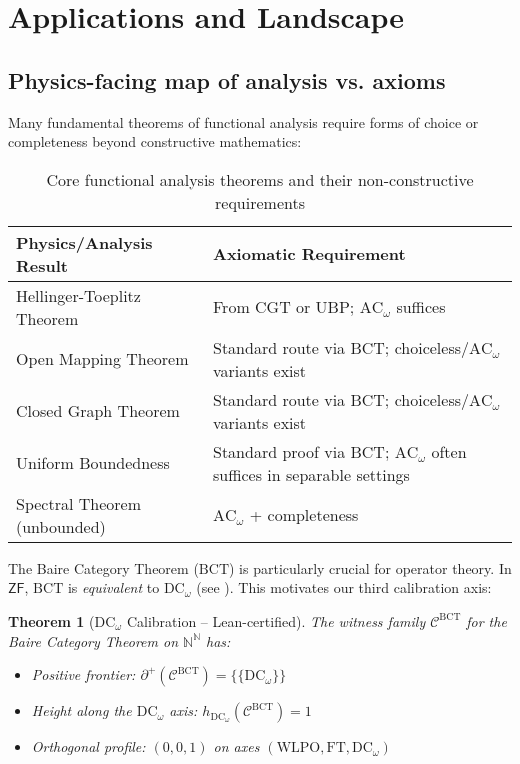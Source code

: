 \documentclass[11pt]{article}
\newtheorem{theorem}{Theorem}[section]
\newcommand{\N}{\mathbb{N}}
\newcommand{\WLPO}{\mathrm{WLPO}}
\newcommand{\FT}{\mathrm{FT}}
\newcommand{\DCw}{\mathrm{DC}_\omega}
\newcommand{\ACw}{\mathrm{AC}_\omega}
\newcommand{\BCT}{\mathrm{BCT}}
\newcommand{\Frontierpos}{\partial^{+}}
\begin{document}
\section{Applications and Landscape}\label{sec:applications}

\subsection{Physics-facing map of analysis vs. axioms}

Many fundamental theorems of functional analysis require forms of choice or completeness beyond constructive mathematics:

\begin{table}[h]
\centering
\begin{tabular}{ll}
\hline
\textbf{Physics/Analysis Result} & \textbf{Axiomatic Requirement} \\
\hline
Hellinger-Toeplitz Theorem & From CGT or UBP; $\ACw{}$ suffices \\
Open Mapping Theorem & Standard route via BCT; choiceless/$\ACw{}$ variants exist \\
Closed Graph Theorem & Standard route via BCT; choiceless/$\ACw{}$ variants exist \\
Uniform Boundedness & Standard proof via BCT; $\ACw{}$ often suffices in separable settings \\
Spectral Theorem (unbounded) & $\ACw{}$ + completeness \\
\hline
\end{tabular}
\caption{Core functional analysis theorems and their non-constructive requirements}
\label{tab:physics-analysis}
\end{table}

The Baire Category Theorem ($\BCT{}$) is particularly crucial for operator theory. In $\mathsf{ZF}$, $\BCT{}$ is \emph{equivalent} to $\DCw{}$ (see \cite{Blair77}). This motivates our third calibration axis:

\begin{theorem}[$\DCw{}$ Calibration -- Lean-certified]\label{thm:dcw-calib}
The witness family $\mathcal{C}^{\BCT}$ for the Baire Category Theorem on $\N^\N$ has:
\begin{itemize}
\item Positive frontier: $\Frontierpos(\mathcal{C}^{\BCT}) = \{\{\DCw\}\}$
\item Height along the $\DCw{}$ axis: $h_{\DCw}(\mathcal{C}^{\BCT}) = 1$
\item Orthogonal profile: $(0, 0, 1)$ on axes $(\WLPO, \FT, \DCw)$
\end{itemize}
\end{theorem}
\end{document}
